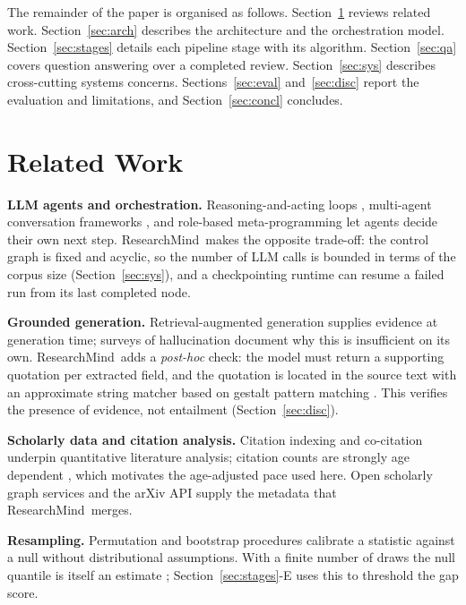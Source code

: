 \documentclass[conference]{IEEEtran}
\newcommand{\RM}{ResearchMind}
\begin{document}
The remainder of the paper is organised as follows. Section~\ref{sec:related} reviews related work. Section~\ref{sec:arch} describes the architecture and the orchestration model. Section~\ref{sec:stages} details each pipeline stage with its algorithm. Section~\ref{sec:qa} covers question answering over a completed review. Section~\ref{sec:sys} describes cross-cutting systems concerns. Sections~\ref{sec:eval} and~\ref{sec:disc} report the evaluation and limitations, and Section~\ref{sec:concl} concludes.

\section{Related Work}
\label{sec:related}
\textbf{LLM agents and orchestration.} Reasoning-and-acting loops \cite{yao2023react}, multi-agent conversation frameworks \cite{wu2023autogen}, and role-based meta-programming \cite{hong2024metagpt} let agents decide their own next step. \RM\ makes the opposite trade-off: the control graph is fixed and acyclic, so the number of LLM calls is bounded in terms of the corpus size (Section~\ref{sec:sys}), and a checkpointing runtime \cite{langgraph} can resume a failed run from its last completed node.

\textbf{Grounded generation.} Retrieval-augmented generation \cite{lewis2020rag} supplies evidence at generation time; surveys of hallucination \cite{ji2023hallucination} document why this is insufficient on its own. \RM\ adds a \emph{post-hoc} check: the model must return a supporting quotation per extracted field, and the quotation is located in the source text with an approximate string matcher based on gestalt pattern matching \cite{ratcliff1988gestalt}. This verifies the presence of evidence, not entailment (Section~\ref{sec:disc}).

\textbf{Scholarly data and citation analysis.} Citation indexing \cite{garfield1955citation} and co-citation \cite{small1973cocitation} underpin quantitative literature analysis; citation counts are strongly age dependent \cite{wang2013quantifying}, which motivates the age-adjusted pace used here. Open scholarly graph services \cite{kinney2023s2} and the arXiv API \cite{arxivapi} supply the metadata that \RM\ merges.

\textbf{Resampling.} Permutation and bootstrap procedures \cite{efron1979bootstrap} calibrate a statistic against a null without distributional assumptions. With a finite number of draws the null quantile is itself an estimate \cite{phipson2010permutation}; Section~\ref{sec:stages}-E uses this to threshold the gap score.
\end{document}
